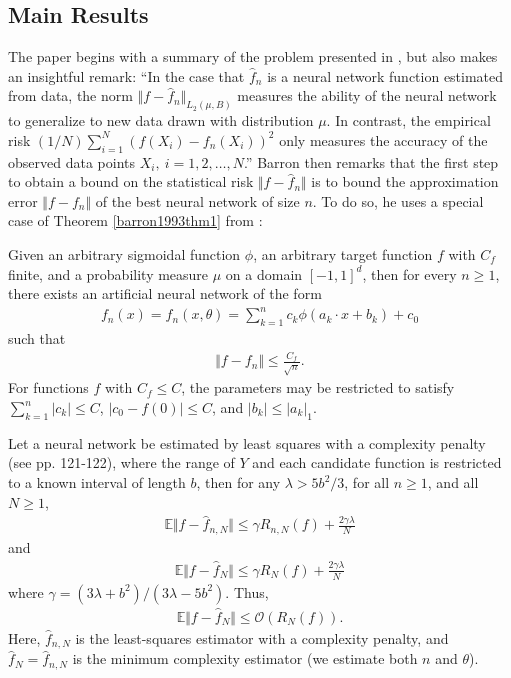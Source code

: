 \documentclass{article}
\newenvironment{manualtheorem}[1]{%
  \renewcommand\themanualtheoreminner{#1}%
  \manualtheoreminner
}{\endmanualtheoreminner}
\begin{document}
\subsection{Main Results}
The paper begins with a summary of the problem presented in \cite{barron1993universal}, but also makes an insightful remark: \enquote{In the case that $\hat{f}_n$ is a neural network function estimated from data, the norm $\Vert f - \hat{f}_n \Vert_{L_2(\mu, B)}$ measures the ability of the neural network to generalize to new data drawn with distribution $\mu$. In contrast, the empirical risk $(1/N) \sum_{i=1}^N (f(X_i) - f_n(X_i))^2$ only measures the accuracy of the observed data points $X_i, \ i = 1, 2, \ldots, N$.} 
Barron then remarks that the first step to obtain a bound on the statistical risk $\Vert f - \hat{f}_n \Vert$ is to bound the approximation error $\Vert f - f_n \Vert$ of the best neural network of size $n$. To do so, he uses a special case of Theorem \ref{barron1993thm1} from \cite{barron1993universal}:
\begin{manualtheorem}{1}
Given an arbitrary sigmoidal function $\phi$, an arbitrary target function $f$ with $C_f$ finite, and a probability measure $\mu$ on a domain $[-1, 1]^d$, then for every $n \geq 1$, there exists an artificial neural network of the form
\begin{align*}
    f_n(x) = f_n(x, \theta) = \sum_{k=1}^n c_k \phi(a_k \cdot x + b_k) + c_0
\end{align*}
such that 
\begin{align*}
    \Vert f - f_n \Vert \leq \frac{C_f}{\sqrt{n}}.
\end{align*}
For functions $f$ with $C_f \leq C$, the parameters may be restricted to satisfy $\sum_{k=1}^n \left| c_k \right| \leq C$, $\left|c_0 - f(0) \right| \leq C$, and $\left| b_k \right| \leq \left| a_k \right|_1$. 
\end{manualtheorem}

\begin{manualtheorem}{2}
Let a neural network be estimated by least squares with a complexity penalty (see pp. 121-122), where the range of $Y$ and each candidate function is restricted to a known interval of length $b$, then for any $\lambda > 5b^2/3$, for all $n \geq 1$, and all $N \geq 1$,
\begin{align*}
    \mathbb{E} \Vert f - \hat{f}_{n, N} \Vert \leq \gamma R_{n, N}(f) + \frac{2 \gamma \lambda}{N}
\end{align*}
and 
\begin{align*}
    \mathbb{E} \Vert f - \hat{f}_{N} \Vert \leq \gamma R_{N}(f) + \frac{2 \gamma \lambda}{N}
\end{align*}
where $\gamma = (3\lambda + b^2)/(3\lambda - 5b^2)$. Thus,
\begin{align*}
    \mathbb{E} \Vert f - \hat{f}_N \Vert \leq \mathcal{O}(R_N(f)).
\end{align*}
\end{manualtheorem}
Here, $\hat{f}_{n, N}$ is the least-squares estimator with a complexity penalty, and $\hat{f}_N = \hat{f}_{\hat{n}, N}$ is the minimum complexity estimator (we estimate both $n$ and $\theta$).



\end{document}
